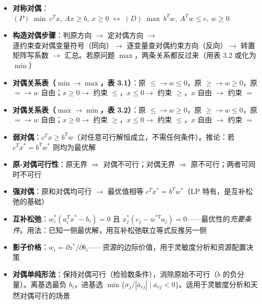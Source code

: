 \begin{itemize}
  \item \textbf{对称对偶}：$(P)\;\min\ c^T x,\ Ax\ge b,\ x\ge0 \;\longleftrightarrow\; (D)\;\max\ b^T w,\ A^T w\le c,\ w\ge0$
  \item \textbf{构造对偶步骤}：判原方向 $\to$ 定对偶方向 $\to$ 逐约束查对偶变量符号（同向）$\to$ 逐变量查对偶约束方向（反向）$\to$ 转置矩阵写系数 $\to$ 汇总。若原问题 $\max$，两条关系都反过来（用表 3.2 或化为 $\min$）
  \item \textbf{对偶关系表（$\min\to\max$，表 3.1）}：原 $\le \to w\le0$，原 $\ge \to w\ge0$，原 $= \to w$ 自由；$x\ge0 \to$ 约束 $\le$，$x\le0 \to$ 约束 $\ge$，$x$ 自由 $\to$ 约束 $=$
  \item \textbf{对偶关系表（$\max\to\min$，表 3.2）}：原 $\le \to w\ge0$，原 $\ge \to w\le0$，原 $= \to w$ 自由；$x\ge0 \to$ 约束 $\ge$，$x\le0 \to$ 约束 $\le$，$x$ 自由 $\to$ 约束 $=$
  \item \textbf{弱对偶}：$c^T x \ge b^T w$（对任意可行解恒成立，不需任何条件）。推论：若 $c^T x^* = b^T w^*$ 则均为最优解
  \item \textbf{原-对偶可行性}：原无界 $\Rightarrow$ 对偶不可行；对偶无界 $\Rightarrow$ 原不可行；两者可同时不可行
  \item \textbf{强对偶}：原和对偶均可行 $\to$ 最优值相等 $c^T x^* = b^T w^*$（LP 特有，是互补松弛的基础）
  \item \textbf{互补松弛}：$w_i^*(a_i^Tx^*-b_i)=0$ 且 $x_j^*(c_j-w^{*T}a_j)=0$——最优性的\emph{充要条件}。用法：已知一侧最优解，用互补松弛联立等式反推另一侧
  \item \textbf{影子价格}：$w_i = \partial z^*/\partial b_i$——资源的边际价值，用于灵敏度分析和资源配置决策
  \item \textbf{对偶单纯形法}：保持对偶可行（检验数条件），消除原始不可行（$b$ 的负分量）。离基选最负 $b_i$，进基选 $\min\{\sigma_j/|\bar{a}_{rj}| \mid \bar{a}_{rj}<0\}$。适用于灵敏度分析和天然对偶可行的场景
\end{itemize}
